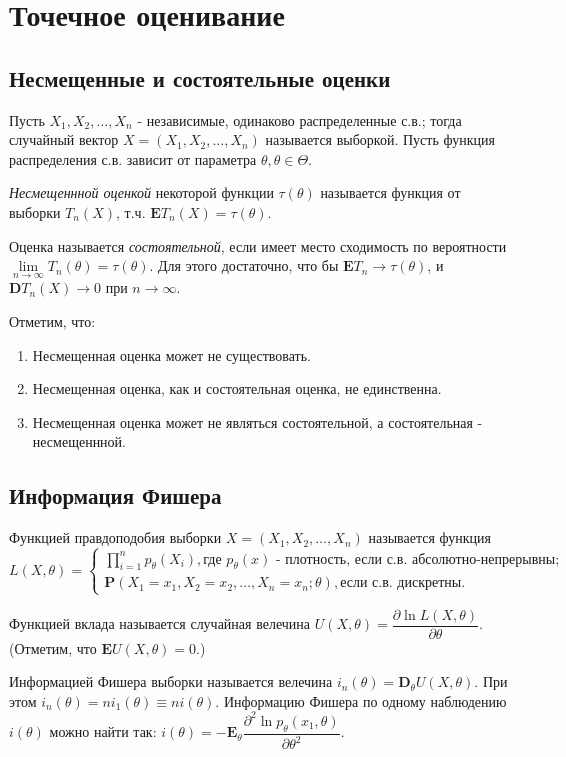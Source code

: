 \documentclass[a4paper,12pt]{scrartcl}
\newcommand{\E}{\mathbf{E}}
\newcommand{\D}{\mathbf{D}}
\newcommand{\Prb}{\mathbf{P}}
\begin{document}
\section{Точечное оценивание}
\subsection{Несмещенные и состоятельные оценки}
Пусть $X_1,X_2,\ldots,X_n$ - независимые, одинаково распределенные с.в.; тогда случайный вектор $X=(X_1,X_2,\ldots,X_n)$ называется выборкой. Пусть функция распределения с.в. зависит от параметра $\theta,\theta \in \Theta.$ 

\emph{Несмещеннной оценкой} некоторой функции $\tau(\theta)$ называется функция от выборки $T_n(X)$, т.ч. $\E T_n(X) = \tau(\theta)$.

Оценка называется \emph{состоятельной}, если имеет место сходимость по вероятности $\lim\limits_{n\to\infty}T_n(\theta) = \tau(\theta)$. Для этого достаточно, что бы $\E T_n \to \tau(\theta)$, и $\D T_n(X) \to 0$ при $ n\to \infty$.

Отметим, что:
\begin{enumerate}
\item Несмещенная оценка может не существовать.
\item Несмещенная оценка, как и состоятельная оценка, не единственна.
\item Несмещенная оценка может не являться состоятельной, а состоятельная - несмещеннной.
\end{enumerate}

\subsection{Информация Фишера}
Функцией правдоподобия выборки $X=(X_1,X_2,\ldots,X_n)$ называется функция 
$$L(X,\theta) = \begin{cases} \prod\limits_{i=1}^{n}p_\theta(X_i), \text{где $p_\theta(x)$ - плотность, если с.в. абсолютно-непрерывны;} \\\Prb(X_1 = x_1,X_2 = x_2, \ldots, X_n = x_n; \theta),  \text{если с.в. дискретны}.
\end{cases}$$

Функцией вклада называется случайная велечина $U(X,\theta) = \dfrac{\partial \ln L(X,\theta)}{\partial \theta}$. (Отметим, что $\E U(X,\theta) =0.$) 

Информацией Фишера выборки называется велечина $i_n(\theta) = \D_\theta U(X,\theta).$ При этом $i_n(\theta) = ni_1(\theta)\equiv ni(\theta).$  Информацию Фишера по одному наблюдению $i(\theta)$ можно найти так: $i(\theta) = - \E_\theta \dfrac{\partial^2 \ln p_\theta(x_1,\theta)}{\partial\theta^2}.$
\end{document}

